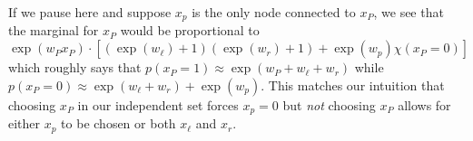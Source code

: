 If we pause here and suppose $x_p$ is the only node connected to $x_P$, we see that the marginal for $x_P$ would be proportional to
$$
\exp(w_P x_P)\cdot\left[\left(\exp(w_\ell)+ 1\right)\left(\exp(w_r) + 1\right) + \exp(w_p)\chi(x_P = 0)\right]
$$
which roughly says that $p(x_P = 1) \approx \exp(w_P + w_\ell + w_r)$ while $p(x_P = 0) \approx \exp(w_\ell + w_r) + \exp(w_p)$.  This matches our intuition that choosing $x_P$ in our independent set forces $x_p = 0$ but \emph{not} choosing $x_P$ allows for either $x_p$ to be chosen or both $x_\ell$ and $x_r$.